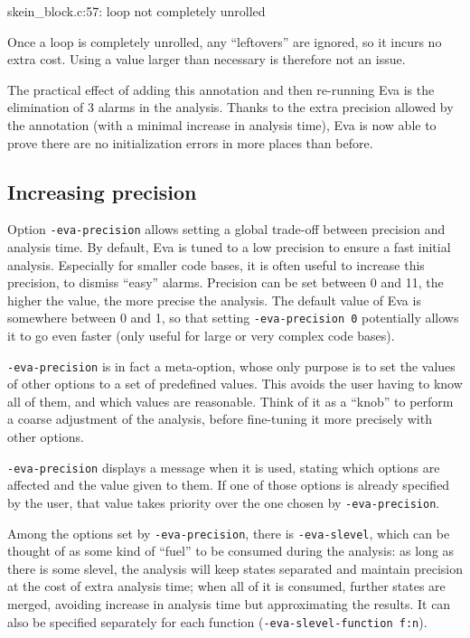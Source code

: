\documentclass[web]{frama-c-book}
\newcommand{\Eva}{\textsf{Eva}}
\begin{document}
\begin{logs}
 skein_block.c:57: loop not completely unrolled
\end{logs}

Once a loop is completely unrolled, any ``leftovers'' are ignored, so it incurs
no extra cost. Using a value larger than necessary is therefore not an issue.

The practical effect of adding this annotation and then re-running \Eva{} is
the elimination of 3 alarms in the analysis. Thanks to the extra precision
allowed by the annotation (with a minimal increase in analysis time), \Eva{}
is now able to prove there are no initialization errors in more places than
before.

\subsection{Increasing precision}

Option \verb|-eva-precision| allows setting a global trade-off between
precision and analysis time. By default, \Eva{} is tuned to a low precision
to ensure a fast initial analysis. Especially for smaller code bases, it is
often useful to increase this precision, to dismiss ``easy'' alarms.
Precision can be set between 0 and 11, the higher the value, the more precise
the analysis. The default value of \Eva{} is somewhere between 0 and 1, so that
setting \verb|-eva-precision 0| potentially allows it to go even faster
(only useful for large or very complex code bases).

\verb|-eva-precision| is in fact a meta-option, whose only purpose is to set
the values of other options to a set of predefined values. This avoids the user
having to know all of them, and which values are reasonable. Think of it as a
``knob'' to perform a coarse adjustment of the analysis, before fine-tuning
it more precisely with other options.

\verb|-eva-precision| displays a message when it is used, stating which options
are affected and the value given to them. If one of those options is already
specified by the user, that value takes priority over the one chosen by
\verb|-eva-precision|.

Among the options set by \verb|-eva-precision|, there is \verb|-eva-slevel|,
which can be thought of as some kind of ``fuel''
to be consumed during the analysis: as long as there is some slevel,
the analysis will keep states separated and maintain precision at the cost of
extra analysis time; when all of
it is consumed, further states are merged, avoiding increase in analysis time
but approximating the results. It can also be
specified separately for each function (\verb|-eva-slevel-function f:n|).
\end{document}
